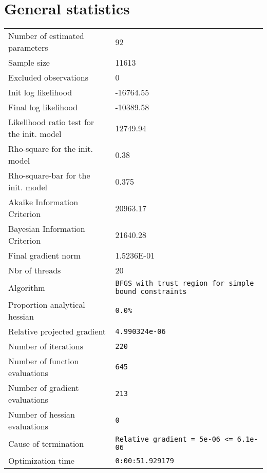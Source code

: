 



\section{General statistics}
\begin{tabular}{ll}
Number of estimated parameters & 92 \\
Sample size & 11613 \\
Excluded observations & 0 \\
Init log likelihood & -16764.55 \\
Final log likelihood & -10389.58 \\
Likelihood ratio test for the init. model & 12749.94 \\
Rho-square for the init. model & 0.38 \\
Rho-square-bar for the init. model & 0.375 \\
Akaike Information Criterion & 20963.17 \\
Bayesian Information Criterion & 21640.28 \\
Final gradient norm & 1.5236E-01 \\
Nbr of threads & 20 \\
Algorithm & \verb$BFGS with trust region for simple bound constraints$ \\
Proportion analytical hessian & \verb$0.0%$ \\
Relative projected gradient & \verb$4.990324e-06$ \\
Number of iterations & \verb$220$ \\
Number of function evaluations & \verb$645$ \\
Number of gradient evaluations & \verb$213$ \\
Number of hessian evaluations & \verb$0$ \\
Cause of termination & \verb$Relative gradient = 5e-06 <= 6.1e-06$ \\
Optimization time & \verb$0:00:51.929179$ \\
\end{tabular}

